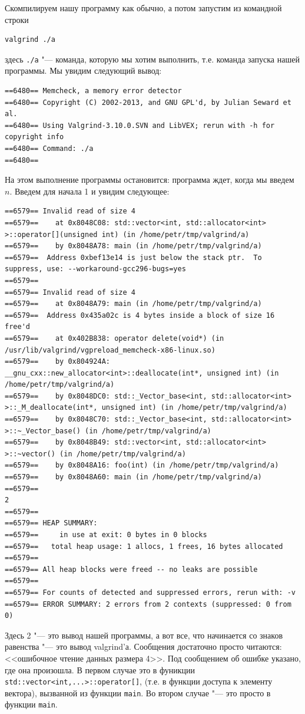 \documentclass[a4paper,10pt]{problems}
\begin{document}
Скомпилируем нашу программу как обычно, а потом запустим из командной строки
\begin{verbatim}
valgrind ./a
\end{verbatim}
здесь \verb`./a` "--- команда, которую мы хотим выполнить, т.е. команда запуска нашей программы. Мы увидим следующий вывод:
\begin{verbatim}
==6480== Memcheck, a memory error detector
==6480== Copyright (C) 2002-2013, and GNU GPL'd, by Julian Seward et al.
==6480== Using Valgrind-3.10.0.SVN and LibVEX; rerun with -h for copyright info
==6480== Command: ./a
==6480== 
\end{verbatim}
На этом выполнение программы остановится: программа ждет, когда мы введем $n$. Введем для начала 1 и увидим следующее:
\begin{verbatim}
==6579== Invalid read of size 4
==6579==    at 0x8048C08: std::vector<int, std::allocator<int> >::operator[](unsigned int) (in /home/petr/tmp/valgrind/a)
==6579==    by 0x8048A78: main (in /home/petr/tmp/valgrind/a)
==6579==  Address 0xbef13e14 is just below the stack ptr.  To suppress, use: --workaround-gcc296-bugs=yes
==6579== 
==6579== Invalid read of size 4
==6579==    at 0x8048A79: main (in /home/petr/tmp/valgrind/a)
==6579==  Address 0x435a02c is 4 bytes inside a block of size 16 free'd
==6579==    at 0x402B838: operator delete(void*) (in /usr/lib/valgrind/vgpreload_memcheck-x86-linux.so)
==6579==    by 0x804924A: __gnu_cxx::new_allocator<int>::deallocate(int*, unsigned int) (in /home/petr/tmp/valgrind/a)
==6579==    by 0x8048DC0: std::_Vector_base<int, std::allocator<int> >::_M_deallocate(int*, unsigned int) (in /home/petr/tmp/valgrind/a)
==6579==    by 0x8048C70: std::_Vector_base<int, std::allocator<int> >::~_Vector_base() (in /home/petr/tmp/valgrind/a)
==6579==    by 0x8048B49: std::vector<int, std::allocator<int> >::~vector() (in /home/petr/tmp/valgrind/a)
==6579==    by 0x8048A16: foo(int) (in /home/petr/tmp/valgrind/a)
==6579==    by 0x8048A60: main (in /home/petr/tmp/valgrind/a)
==6579== 
2
==6579== 
==6579== HEAP SUMMARY:
==6579==     in use at exit: 0 bytes in 0 blocks
==6579==   total heap usage: 1 allocs, 1 frees, 16 bytes allocated
==6579== 
==6579== All heap blocks were freed -- no leaks are possible
==6579== 
==6579== For counts of detected and suppressed errors, rerun with: -v
==6579== ERROR SUMMARY: 2 errors from 2 contexts (suppressed: 0 from 0)                                                                                                                                                                                                        \end{verbatim}
Здесь 2 "--- это вывод нашей программы, а вот все, что начинается со знаков равенства "--- это вывод valgrind'а. 
Сообщения достаточно просто читаются: <<ошибочное чтение данных размера 4>>. 
Под сообщением об ошибке указано, где она произошла. В первом случае это в фуникции \verb`std::vector<int,...>::operator[]`, 
(т.е. в функции доступа к элементу вектора), вызванной из функции \verb`main`. Во втором случае "--- это просто в функции \verb`main`.
\end{document}
